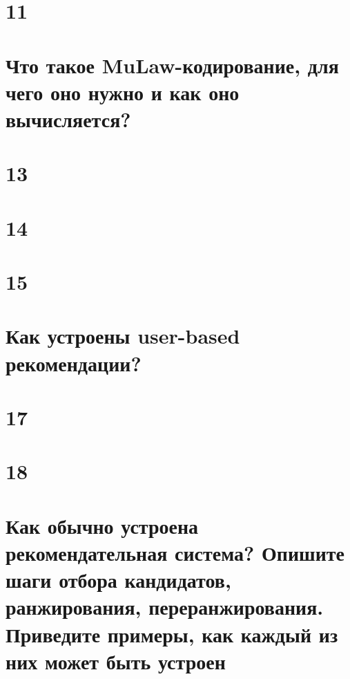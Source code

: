 \documentclass[14pt]{extarticle}
\begin{document}
	\newpage
	
	\section{11}
	
	
	\newpage
	
	\section{Что такое MuLaw-кодирование, для чего оно нужно и как оно вычисляется?}
	
	
	\newpage
	
	\section{13}
	
	
	\newpage
	
	\section{14}
	
	
	\section{15} %
	
	
	\newpage
	
	\section{Как устроены user-based рекомендации?}  
	
	
	\newpage
	
	\section{17} %
	
	
	\newpage
	
	\section{18} 
	
	
	\newpage
	
	\section{Как обычно устроена рекомендательная система? Опишите шаги отбора кандидатов, ранжирования, переранжирования. Приведите примеры, как каждый из них может быть устроен} 
	
\end{document}
